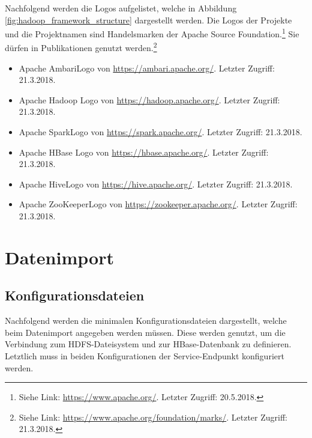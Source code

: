 \noindent
Nachfolgend werden die Logos aufgelistet, welche in Abbildung \ref{fig:hadoop_framework_structure} dargestellt werden. Die Logos der Projekte und die Projektnamen sind Handelsmarken der Apache Source Foundation.\footnote{Siehe Link: \url{https://www.apache.org/}. Letzter Zugriff: 20.5.2018.} Sie dürfen in Publikationen genutzt werden.\footnote{Siehe Link: \url{https://www.apache.org/foundation/marks/}. Letzter Zugriff: 21.3.2018.}

\begin{itemize}
\item Apache Ambari\texttrademark\thinspace Logo von \url{https://ambari.apache.org/}. Letzter Zugriff: 21.3.2018. 
\item Apache Hadoop\textsuperscript{\textregistered} Logo von \url{https://hadoop.apache.org/}. Letzter Zugriff: 21.3.2018.
\item Apache Spark\texttrademark\thinspace Logo von \url{https://spark.apache.org/}. Letzter Zugriff: 21.3.2018.
\item Apache HBase\textsuperscript{\textregistered} Logo von \url{https://hbase.apache.org/}. Letzter Zugriff: 21.3.2018.
\item Apache Hive\texttrademark\thinspace Logo von \url{https://hive.apache.org/}. Letzter Zugriff: 21.3.2018.
\item Apache ZooKeeper\texttrademark\thinspace Logo von \url{https://zookeeper.apache.org/}. Letzter Zugriff: 21.3.2018.
\end{itemize}


\chapter{Datenimport}
\section{Konfigurationsdateien}
\label{sec:appendix_data_import_config_management}
Nachfolgend werden die minimalen Konfigurationsdateien dargestellt, welche beim Datenimport angegeben werden müssen. Diese werden genutzt, um die Verbindung zum HDFS-Dateisystem und zur HBase-Datenbank zu definieren. Letztlich muss in beiden Konfigurationen der Service-Endpunkt konfiguriert werden.





